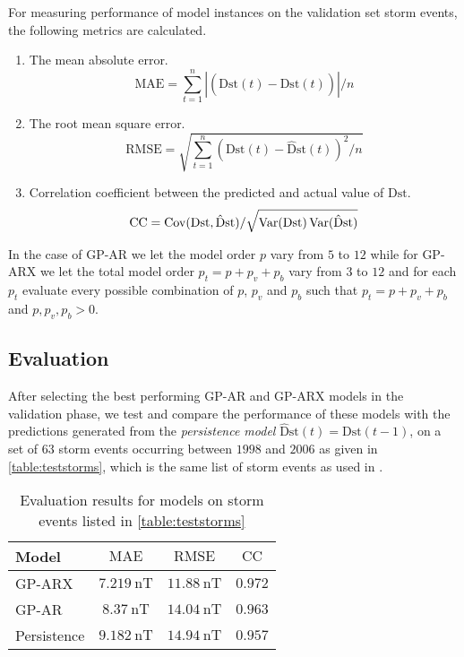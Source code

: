For measuring performance of model instances on the validation set storm events, the following 
metrics are calculated.

\begin{enumerate}
    \item The mean absolute error.
    \begin{equation}
        \mathrm{MAE} = \sum_{t=1}^{n} \left |(\mathrm{Dst}(t) - \mathrm{\hat{D}st}(t)) \right | / n
    \end{equation}
    \item The root mean square error.
    \begin{equation}
        \mathrm{RMSE} = \sqrt{\sum_{t=1}^{n} (\mathrm{Dst}(t) - \mathrm{\hat{D}st}(t))^2 / n}
    \end{equation}
    \item Correlation coefficient between the predicted and actual value of $ \mathrm{Dst}$.
    \begin{equation}
        \mathrm{CC} = \operatorname*{Cov}(\mathrm{Dst}, \mathrm{\hat{D}st})/\sqrt{\operatorname*{Var}(\mathrm{Dst}) \operatorname*{Var}(\mathrm{\hat{D}st})}
    \end{equation}
\end{enumerate}
%
In the case of GP-AR we let the model order $p$ vary from $5$ to $12$ while for GP-ARX we let the 
total model order $p_t = p + p_v + p_b$ vary from $3$ to $12$ and for each $p_t$ evaluate every 
possible combination of $p$, $p_v$ and $p_b$ such that $p_t = p + p_v + p_b$ and 
$p, p_{v}, p_b > 0$.


\subsection*{Evaluation}\label{sec:gpOSAEval}

After selecting the best performing GP-AR and GP-ARX models in the validation phase, we test and 
compare the performance of these models with the predictions generated from the 
\emph{persistence model} $\mathrm{\hat{D}st}(t) = \mathrm{Dst}(t-1)$, on a set of $63$ storm events 
occurring between $1998$ and $2006$ as given in \cref{table:teststorms}, which is the same list of 
storm events as used in \citet{Ji2012}.

\begin{table}[ht]
    \centering
    \caption{Evaluation results for models on storm events listed in \cref{table:teststorms}}
    \label{table:results}
    \begin{tabular}{l c c c}
    \hline
    \textbf{Model} & $\mathrm{MAE}$ & $\mathrm{RMSE}$ & $\mathrm{CC}$\\ \hline
    GP-ARX & $\SI{7.219}{\nano\tesla}$ & $\SI{11.88}{\nano\tesla}$ & $0.972$\\
    GP-AR & $\SI{8.37}{\nano\tesla}$ & $\SI{14.04}{\nano\tesla}$ & $0.963$\\
    Persistence & $\SI{9.182}{\nano\tesla}$ & $\SI{14.94}{\nano\tesla}$ & $0.957$\\
    \hline
    \end{tabular}
\end{table}

